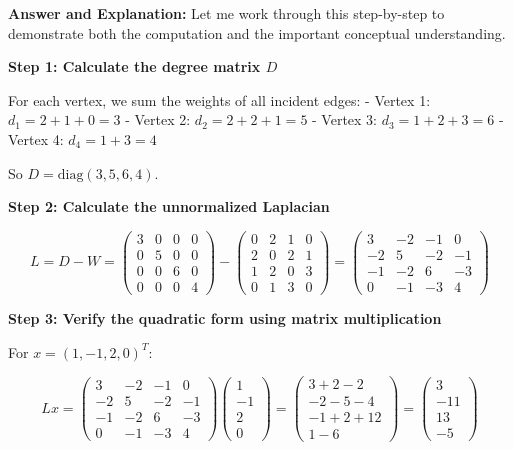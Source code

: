 \documentclass[11pt]{article}
\newenvironment{answer}{\color{answercolor}\begin{framed}\textbf{Answer and Explanation:}}{\end{framed}}
\begin{document}
\begin{answer}
Let me work through this step-by-step to demonstrate both the computation and the important conceptual understanding.

\textbf{Step 1: Calculate the degree matrix $D$}

For each vertex, we sum the weights of all incident edges:
- Vertex 1: $d_1 = 2 + 1 + 0 = 3$
- Vertex 2: $d_2 = 2 + 2 + 1 = 5$  
- Vertex 3: $d_3 = 1 + 2 + 3 = 6$
- Vertex 4: $d_4 = 1 + 3 = 4$

So $D = \text{diag}(3, 5, 6, 4)$.

\textbf{Step 2: Calculate the unnormalized Laplacian}

$$L = D - W = \begin{pmatrix}
3 & 0 & 0 & 0 \\
0 & 5 & 0 & 0 \\
0 & 0 & 6 & 0 \\
0 & 0 & 0 & 4
\end{pmatrix} - \begin{pmatrix}
0 & 2 & 1 & 0 \\
2 & 0 & 2 & 1 \\
1 & 2 & 0 & 3 \\
0 & 1 & 3 & 0
\end{pmatrix} = \begin{pmatrix}
3 & -2 & -1 & 0 \\
-2 & 5 & -2 & -1 \\
-1 & -2 & 6 & -3 \\
0 & -1 & -3 & 4
\end{pmatrix}$$

\textbf{Step 3: Verify the quadratic form using matrix multiplication}

For $x = (1, -1, 2, 0)^T$:

$$Lx = \begin{pmatrix}
3 & -2 & -1 & 0 \\
-2 & 5 & -2 & -1 \\
-1 & -2 & 6 & -3 \\
0 & -1 & -3 & 4
\end{pmatrix} \begin{pmatrix}
1 \\ -1 \\ 2 \\ 0
\end{pmatrix} = \begin{pmatrix}
3 + 2 - 2 \\ -2 - 5 - 4 \\ -1 + 2 + 12 \\ 1 - 6
\end{pmatrix} = \begin{pmatrix}
3 \\ -11 \\ 13 \\ -5
\end{pmatrix}$$


\end{answer}
\end{document}
